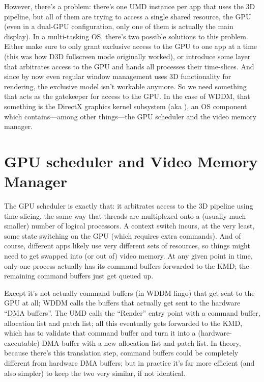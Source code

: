 However, there's a problem: there's one UMD instance per app that uses the 3D 
pipeline, but all of them are trying to access a single shared resource, the 
GPU (even in a dual-GPU configuration, only one of them is actually the main 
display).  In a multi-tasking OS, there's two possible solutions to this 
problem.  Either make sure to only grant exclusive access to the GPU to one app 
at a time (this was how D3D fullscreen mode originally worked), or introduce 
some layer that arbitrates access to the GPU and hands all processes their 
time-slices.  And since by now even regular window management uses 3D 
functionality for rendering, the exclusive model isn't workable anymore. So we 
need something that acts as the gatekeeper for access to the GPU. In the case 
of WDDM, that something is the DirectX graphics kernel subsystem (aka 
), an OS component which contains---among other things---the 
GPU scheduler and the video memory manager.

\section{GPU scheduler and Video Memory Manager}

The GPU scheduler is exactly that: it arbitrates access to the 3D pipeline 
using time-slicing, the same way that threads are multiplexed onto a (usually 
much smaller) number of logical processors. A context switch incurs, at the 
very least, some state switching on the GPU (which requires extra commands).  
And of course, different apps likely use very different sets of resources, so 
things might need to get swapped into (or out of) video memory. At any given 
point in time, only one process actually has its command buffers forwarded to 
the KMD; the remaining command buffers just get queued up.

Except it's not actually command buffers (in WDDM lingo) that get sent to the 
GPU at all; WDDM calls the buffers that actually get sent to the hardware ``DMA 
buffers''. The UMD calls the ``Render'' entry point with a command buffer, 
allocation list and patch list; all this eventually gets forwarded to the KMD, 
which has to validate that command buffer and turn it into 
a (hardware-executable) DMA buffer with a new allocation list and patch list.  
In theory, because there's this translation step, command buffers could be 
completely different from hardware DMA buffers; but in practice it's far more 
efficient (and also simpler) to keep the two very similar, if not identical.

